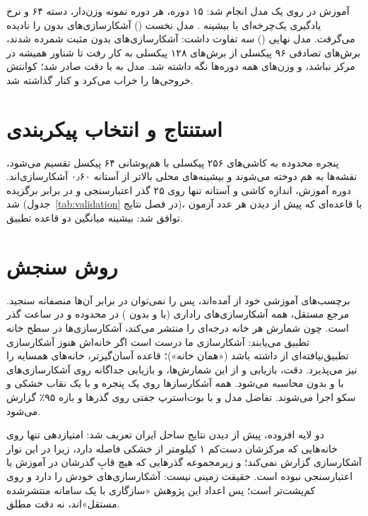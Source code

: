 آموزش در  روی یک  مدل  انجام شد: ۱۵ دوره، هر دوره
 نمونه وزن‌دار، دسته ۶۴ و نرخ یادگیری یک‌چرخه‌ای با بیشینه .
مدل نخست () آشکارسازی‌های بدون  را نادیده می‌گرفت. مدل نهایی
() سه تفاوت داشت: آشکارسازی‌های بدون   مثبت شمرده شدند، برش‌های
تصادفی ۹۶ پیکسلی از برش‌های ۱۲۸ پیکسلی به کار رفت تا شناور همیشه در مرکز نباشد، و وزن‌های
همه دوره‌ها نگه داشته شد. مدل به  با دقت  صادر شد؛ کوانتش 
خروجی‌ها را خراب می‌کرد و کنار گذاشته شد.

\section{استنتاج و انتخاب پیکربندی}
پنجره محدوده به کاشی‌های ۲۵۶ پیکسلی با هم‌پوشانی ۶۴ پیکسل تقسیم می‌شود، نقشه‌ها به هم
دوخته می‌شوند و بیشینه‌های محلی بالاتر از آستانه ۰٫۶۰ آشکارسازی‌اند. دوره آموزش، اندازه
کاشی و آستانه تنها روی ۲۵ گذر اعتبارسنجی و در برابر  برگزیده شد
(جدول~\ref{tab:validation} در فصل نتایج)، با قاعده‌ای که پیش از دیدن هر عدد آزمون توافق شد:
بیشینه میانگین  دو قاعده تطبیق.

\section{روش سنجش}
\label{sec:evaluation}
برچسب‌های آموزشی خود از  آمده‌اند، پس  را نمی‌توان در برابر آن‌ها منصفانه
سنجید. مرجع مستقل، همه آشکارسازی‌های راداری  (با و بدون ) در محدوده و در ساعت
گذر است. چون  شمارش هر خانه  درجه‌ای را منتشر می‌کند، آشکارسازی‌ها در سطح
خانه تطبیق می‌یابند: آشکارسازی ما درست است اگر خانه‌اش هنوز آشکارسازی تطبیق‌نیافته‌ای از
 داشته باشد («همان خانه»)؛ قاعده آسان‌گیرتر، خانه‌های همسایه را نیز می‌پذیرد. دقت،
بازیابی و  از این شمارش‌ها، و بازیابی جداگانه روی آشکارسازی‌های با و بدون 
محاسبه می‌شود. همه آشکارسازها روی یک پنجره و با یک نقاب خشکی و سکو اجرا می‌شوند. تفاضل
مدل و  با بوت‌استرپ جفتی روی گذرها \cite{efron1993} و بازه ۹۵٪ گزارش می‌شود.

دو لایه افزوده، پیش از دیدن نتایج ساحل ایران تعریف شد: امتیازدهی تنها روی خانه‌هایی که مرکزشان
دست‌کم ۱ کیلومتر از خشکی فاصله دارد، زیرا  در این نوار آشکارسازی گزارش نمی‌کند؛ و
زیرمجموعه گذرهایی که هیچ قابِ گذرشان در آموزش یا اعتبارسنجی نبوده است.  حقیقت
زمینی نیست: آشکارسازی‌های خودش را دارد و روی  کم‌پشت‌تر است؛ پس اعداد این
پژوهش «سازگاری با یک سامانه منتشرشده مستقل»اند، نه دقت مطلق.

